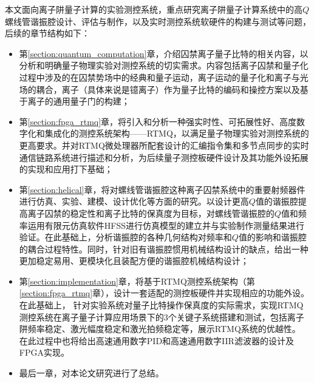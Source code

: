 本文面向离子阱量子计算的实验测控系统，重点研究离子阱量子计算系统中的高$Q$螺线管谐振腔设计、评估与制作，以及实时测控系统软硬件的构建与测试等问题，后续的章节结构如下：
\begin{itemize}
    \item 第\ref{section:quantum_computation}章，介绍囚禁离子量子比特的相关内容，以分析和明确量子物理实验对测控系统的切实需求。内容包括离子囚禁和量子化过程中涉及的在囚禁势场中的经典和量子运动，离子运动的量子化和离子与光场的耦合，离子（具体来说是镱离子）作为量子比特的编码和操控方案以及基于离子的通用量子门的构建；
    \item 第\ref{section:fpga_rtmq}章，将引入和分析一种强实时性、可拓展性好、高度数字化和集成化的测控系统架构——RTMQ，以满足量子物理实验对测控系统的更高要求。并对RTMQ微处理器所配套设计的汇编指令集和多节点同步的实时通信链路系统进行描述和分析，为后续量子测控板硬件设计及其功能外设拓展的实现和应用打下基础；
    \item 第\ref{section:helical}章，将对螺线管谐振腔这种离子囚禁系统中的重要射频器件进行仿真、实验、建模、设计优化等方面的研究。以设计更高$Q$值的谐振腔提高离子囚禁的稳定性和离子比特的保真度为目标，对螺线管谐振腔的$Q$值和频率运用有限元仿真软件HFSS进行仿真模型的建立并与实验制作测量结果进行验证。在此基础上，分析谐振腔的各种几何结构对频率和$Q$值的影响和谐振腔的耦合过程特性。同时，针对旧有谐振腔惯用机械结构设计的缺点，给出一种更加稳定易用、更模块化且装配方便的谐振腔机械结构设计；
    \item 第\ref{section:implementation}章，将基于RTMQ测控系统架构（第\ref{section:fpga_rtmq}章），设计一套适配的测控板硬件并实现相应的功能外设。
    在此基础上，
    针对实验系统对量子比特操作保真度的实际需求，实现RTMQ测控系统在离子量子计算应用场景下的3个关键子系统搭建和测试，包括离子阱频率稳定、激光幅度稳定和激光拍频稳定等，展示RTMQ系统的优越性。
    在此过程中也将给出高速通用数字PID和高速通用数字IIR滤波器的设计及FPGA实现。
    \item 最后一章，对本论文研究进行了总结。
\end{itemize}